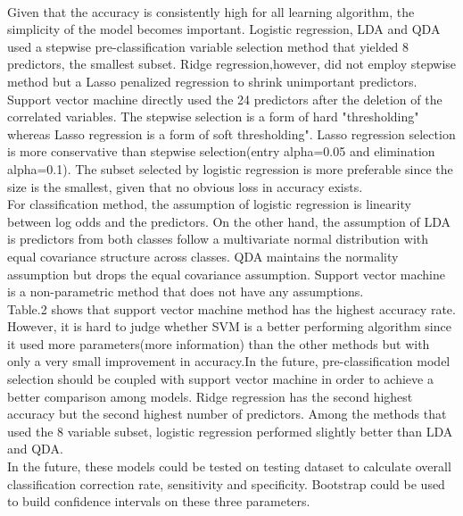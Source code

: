 \documentclass[11pt]{article}
\begin{document}
 \vspace{2ex}\\ 
Given that the accuracy is consistently high for all learning algorithm, the simplicity of the model becomes important. Logistic regression, LDA and QDA used a stepwise pre-classification variable selection method that yielded 8 predictors, the smallest subset. Ridge regression,however, did not employ stepwise method but a Lasso penalized regression to shrink unimportant predictors. Support vector machine directly used the 24 predictors after the deletion of the correlated variables.  The stepwise selection is a form of hard "thresholding" whereas Lasso regression is a form of soft thresholding". Lasso regression selection is more conservative than stepwise selection(entry alpha=0.05 and elimination alpha=0.1). The subset selected by logistic regression is more preferable since the size is the smallest, given that no obvious loss in accuracy exists.   \vspace{2ex}\\ 
For classification method, the assumption of logistic regression is linearity between log odds and the predictors. On the other hand, the assumption of LDA is predictors from both classes follow a multivariate normal distribution with equal covariance structure across classes. QDA maintains the normality assumption but drops the equal covariance assumption. Support vector machine is a non-parametric method that does not have any assumptions.  \vspace{2ex}\\ 
Table.2 shows that support vector machine method has the highest accuracy rate. However, it is hard to judge whether SVM is a better performing algorithm since it used more parameters(more information) than the other methods but with only a very small improvement in accuracy.In the future, pre-classification model selection should be coupled with support vector machine in order to achieve a better comparison among models. Ridge regression has the second highest accuracy but the second highest number of predictors. Among the methods that used the 8 variable subset, logistic regression performed slightly better than LDA and QDA.  \vspace{2ex}\\ 
In the future, these models could be tested on testing dataset to calculate overall classification correction rate, sensitivity and specificity. Bootstrap could be used to build confidence intervals on these three parameters. \vspace{2ex}\\
\end{document}
